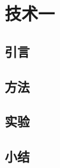 \chapter{技术一}\label{chap:wildcard}

\section{引言}\label{sec:chap4intro}

\section{方法}

\section{实验}

\section{小结}

